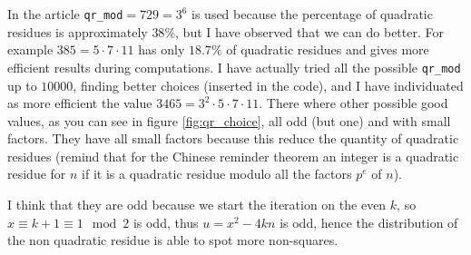 \documentclass{article}
\theoremstyle{plain}
\theoremstyle{remark}
\theoremstyle{definition}
\begin{document}
In the article \verb|qr_mod|$=729=3^6$ is used because the percentage of quadratic residues is approximately $ 38 \%$, but I have observed that we can do better. For example $385 = 5 \cdot 7 \cdot 11$ has only $18.7 \%$ of quadratic residues and gives more efficient results during computations.  
I have actually tried all the possible \verb|qr_mod| up to $10000$, finding better choices (inserted in the code), and I have individuated as more efficient the value $3465 = 3^2 \cdot 5 \cdot 7 \cdot 11$. There where other possible good values, as you can see in figure \ref{fig:qr_choice}, all odd (but one) and with small factors. 
They have all small factors because this reduce the quantity of quadratic residues (remind that for the Chinese reminder theorem an integer is a quadratic residue for $n$ if it is a quadratic residue modulo all the factors $p^e$ of $n$).

I think that they are odd because we start the iteration on the even $k$, so $x \equiv k+1 \equiv 1 \mod 2$ is odd, thus $u = x^2 - 4kn$ is odd, hence the distribution of the non quadratic residue is able to spot more non-squares. 

\newpage
\printbibliography
\end{document}
